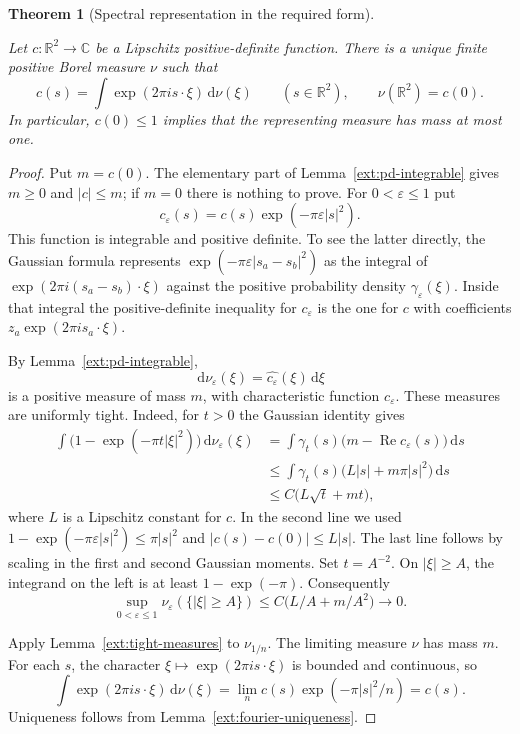 \documentclass[11pt]{amsart}
\newcommand{\R}{\mathbb R}
\newcommand{\C}{\mathbb C}
\newcommand{\dd}{\,\mathrm d}
\newtheorem{theorem}{Theorem}[section]
\theoremstyle{definition}
\theoremstyle{remark}
\numberwithin{equation}{section}
\providecommand{\lean}[1]{}
\providecommand{\leanok}{}
\begin{document}
\begin{theorem}[Spectral representation in the required form]
\label{ext:bochner}
\lean{Auto.ext_bochner,Auto.ext_bochner_mass_le_one}
\leanok
Let $c:\R^2\to\C$ be a Lipschitz positive-definite function.
There is a unique finite positive Borel measure $\nu$ such that
\[
 c(s)=\int\exp(2\pi i s\cdot\xi)\dd\nu(\xi)
 \qquad(s\in\R^2),\qquad \nu(\R^2)=c(0).
\]
In particular, $c(0)\le1$ implies that the representing measure
has mass at most one.
\end{theorem}
\begin{proof}
Put $m=c(0)$.  The elementary part of
Lemma~\ref{ext:pd-integrable} gives $m\ge0$ and $|c|\le m$;
if $m=0$ there is nothing to prove.  For $0<\varepsilon\le1$
put
\[
 c_\varepsilon(s)=c(s)\exp(-\pi\varepsilon|s|^2).
\]
This function is integrable and positive definite.  To see the
latter directly, the Gaussian formula represents
$\exp(-\pi\varepsilon|s_a-s_b|^2)$ as the integral of
$\exp(2\pi i(s_a-s_b)\cdot\xi)$ against the positive
probability density $\gamma_\varepsilon(\xi)$.  Inside that
integral the positive-definite inequality for
$c_\varepsilon$ is the one for $c$ with coefficients
$z_a\exp(2\pi i s_a\cdot\xi)$.

By Lemma~\ref{ext:pd-integrable},
\[
 \dd\nu_\varepsilon(\xi)
       =\widehat{c_\varepsilon}(\xi)\dd\xi
\]
is a positive measure of mass $m$, with characteristic function
$c_\varepsilon$.  These measures are uniformly tight.  Indeed,
for $t>0$ the Gaussian identity gives
\begin{align*}
 \int\big(1-\exp(-\pi t|\xi|^2)\big)\dd\nu_\varepsilon(\xi)
 &=\int\gamma_t(s)
       \big(m-\operatorname{Re}c_\varepsilon(s)\big)\dd s\\
 &\le\int\gamma_t(s)
       \big(L|s|+m\pi|s|^2\big)\dd s\\
 &\le C\big(L\sqrt t+mt\big),
\end{align*}
where $L$ is a Lipschitz constant for $c$.  In the second line
we used $1-\exp(-\pi\varepsilon|s|^2)\le\pi|s|^2$ and
$|c(s)-c(0)|\le L|s|$.  The last line follows by scaling
in the first and second Gaussian moments.  Set $t=A^{-2}$.
On $|\xi|\ge A$, the integrand on the left is at least
$1-\exp(-\pi)$.  Consequently
\[
 \sup_{0<\varepsilon\le1}\nu_\varepsilon(\{|\xi|\ge A\})
       \le C\big(L/A+m/A^2\big)\longrightarrow0.
\]

Apply Lemma~\ref{ext:tight-measures} to
$\nu_{1/n}$.  The limiting measure $\nu$ has mass $m$.
For each $s$, the character $\xi\mapsto\exp(2\pi i s\cdot\xi)$
is bounded and continuous, so
\[
 \int\exp(2\pi i s\cdot\xi)\dd\nu(\xi)
   =\lim_n c(s)\exp(-\pi|s|^2/n)=c(s).
\]
Uniqueness follows from Lemma~\ref{ext:fourier-uniqueness}.
\end{proof}
\end{document}

